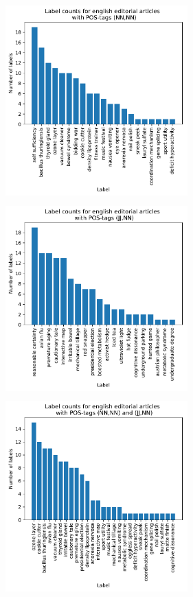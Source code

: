 {%
\begin{figure}[h]
	\begin{minipage}[t]{0.5\textwidth}
		\includegraphics[width=7cm,height=7.5cm]{gfx/POS-gen1/mit_NN.pdf}
	\end{minipage}
	\begin{minipage}[t]{0.5\textwidth}
		\includegraphics[width=7cm,height=7.5cm]{gfx/POS-gen1/mit_JJNN.pdf}
	\end{minipage}
	\begin{minipage}[t]{0.5\textwidth}
		\includegraphics[width=7cm,height=7.5cm]{gfx/POS-gen1/mit_beiden_pos.pdf}

\end{minipage}
\end{figure}}
